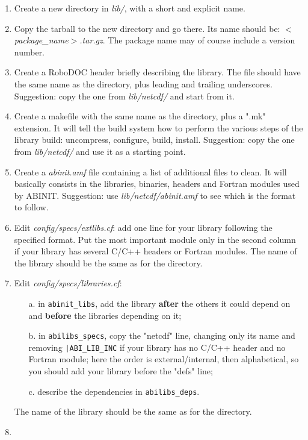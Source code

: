 \begin{enumerate}
 \item
 Create a new directory in \textit{lib/}, with a short and explicit name.
 \item
 Copy the tarball to the new directory and go there. Its name should
 be: \textit{$<$package\_name$>$.tar.gz}. The package name may of course
 include a version number.
 \item
 Create a RoboDOC header briefly describing the library. The file
 should have the same name as the directory, plus leading and trailing
 underscores. Suggestion: copy the one from \textit{lib/netcdf/} and start
 from it.
 \item
 Create a makefile with the same name as the directory, plus a ".mk"
 extension. It will tell the build system how to perform the various
 steps of the library build: uncompress, configure, build, install.
 Suggestion: copy the one from \textit{lib/netcdf/} and use it as a starting
 point.
 \item
 Create a \textit{abinit.amf} file containing a list of additional files to
 clean. It will basically consists in the libraries, binaries, headers
 and Fortran modules used by ABINIT. Suggestion: use
 \textit{lib/netcdf/abinit.amf} to see which is the format to follow.
 \item
 Edit \textit{config/specs/extlibs.cf}: add one line for your library following
 the specified format. Put the most important module only in the second
 column if your library has several C/C++ headers or Fortran modules.
 The name of the library should be the same as for the directory.
 \item    
 Edit \textit{config/specs/libraries.cf}: 
 \begin{itemize}
  \item[a. ]
  in \texttt{abinit\_libs}, add the library \textbf{after} the others it
  could depend on and \textbf{before} the libraries depending on it;
  \item[b. ]
  in \texttt{abilibs\_specs}, copy the "netcdf" line, changing only its
  name and removing \texttt{|ABI\_LIB\_INC} if your library has no C/C++
  header and no Fortran module; here the order is
  external/internal, then alphabetical, so you should add your
  library before the "defs" line;
  \item[c. ]
  describe the dependencies in \texttt{abilibs\_deps}.
 \end{itemize}
 The name of the library should be the same as for the directory.
 \item

\end{enumerate}

